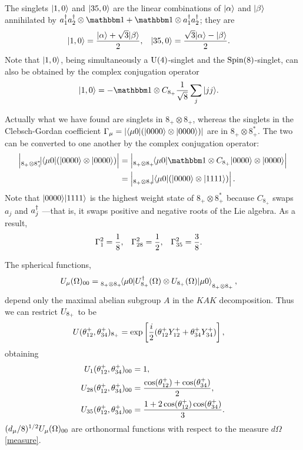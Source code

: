 The singlets ${\left\vert{1,0}\right\rangle}$ and ${\left\vert{35,0}\right\rangle}$ are the linear combinations of ${\left\vert{\alpha}\right\rangle}$ and ${\left\vert{\beta}\right\rangle}$ annihilated by $a\dgg_1a\dgg_2 \otimes \id + \id \otimes a\dgg_1a\dgg_2$; they are
\begin{align}
{\left\vert{\text 1,0}\right\rangle} &= \frac{{\left\vert{\alpha}\right\rangle} + \sqrt{3} {\left\vert{\beta}\right\rangle} }{2}, &
{\left\vert{\text 35,0}\right\rangle} &= \frac{\sqrt{3} {\left\vert{\alpha}\right\rangle} - {\left\vert{\beta}\right\rangle} }{2}.
\end{align}
Note that ${\left\vert{1,0}\right\rangle}$, being simultaneously a $\text{U}(4)$-singlet and the $\text{Spin}(8)$-singlet, can also be obtained by the complex conjugation operator
\begin{align}
	\ket{1,0} &= -\id \otimes C_{8_+} \frac{1}{\sqrt{8}} \sum_j \ket{jj}.
\end{align}

Actually what we have found are singlets in $8_+ \otimes 8_+$, whereas the singlets in the Clebsch-Gordan coefficient $\Gamma_{\mu} = |{\left\langle{\mu 0}\right\vert} ({\left\vert{0000}\right\rangle} \otimes {\left\vert{0000}\right\rangle})|$ are in $8_+ \otimes 8_+^*$. The two can be converted to one another by the complex conjugation operator:
\begin{align}
	\left| \prescript{}{8_+ \otimes 8_+^*}{}\!\!|\bra{\mu 0} (\ket{0000} \otimes \ket{0000}) \right|
		&= \left| \prescript{}{8_+ \otimes 8_+}{}\!\!\braket{\mu 0|\id \otimes C_{8_+}|0000} \otimes \ket{0000} \right| \\
		&= \left| \prescript{}{8_+ \otimes 8_+}{}\!\!|\bra{\mu 0} (\ket{0000} \otimes \ket{1111}) \right|.
\end{align}
Note that ${\left\vert{0000}\right\rangle}{\left\vert{1111}\right\rangle}$ is the highest weight state of $8_+ \otimes 8_+^*$ because $C_{8_+}$ swaps $a_j$ and $a^{\dagger}_j$ ---that is, it swaps positive and negative roots of the Lie algebra. As a result,
\begin{align}\label{cg-coefficients}
	\Gamma_{\text 1}^2 &= \frac{1}{8}, & \Gamma_{\text 28}^2 &= \frac{1}{2}, & \Gamma_{\text 35}^2 &= \frac{3}{8}.
\end{align}


The spherical functions,
\begin{align}
	U_{\mu}(\Omega)_{00} &=
	\prescript{}{8_+\otimes 8_+}{}\!\!\braket{\mu 0|U_{8_+}^{\dagger}(\Omega) \otimes U_{8_+}(\Omega)|\mu 0}_{8_+\otimes 8_+},
\end{align}
depend only the maximal abelian subgroup $A$ in the $KAK$ decomposition. Thus we can restrict $U_{8_+}$ to be
\begin{align}
U(\theta^+_{12},\theta^+_{34})_{8_+} &= \exp \left[ \frac{i}{2}(\theta^+_{12} Y^+_{12} + \theta^+_{34} Y^+_{34}) \right],
\end{align}
obtaining
\begin{align}
U_{1}(\theta^+_{12},\theta^+_{34})_{00} &= 1, \\
U_{28}(\theta^+_{12},\theta^+_{34})_{00} &= \frac{\cos(\theta^+_{12}) + \cos(\theta^+_{34})}{2}, \\
U_{35}(\theta^+_{12},\theta^+_{34})_{00} &= \frac{1+2\cos(\theta^+_{12}) \cos(\theta^+_{34})}{3}.
\end{align}
$(d_{\mu}/8)^{1/2} U_{\mu}(\Omega)_{00}$ are orthonormal functions with respect to the measure $d\Omega$ \eqref{measure}.

